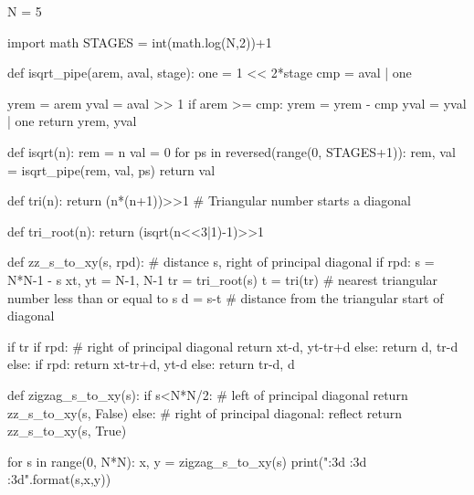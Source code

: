 \documentclass[10pt]{article}
\theoremstyle{theorem}
\begin{document}
\begin{python}
N = 5

import math
STAGES = int(math.log(N,2))+1

def isqrt_pipe(arem, aval, stage):
    one = 1 << 2*stage
    cmp = aval | one

    yrem = arem
    yval = aval >> 1
    if arem >= cmp:
        yrem = yrem - cmp
        yval = yval | one
    return yrem, yval

def isqrt(n):
    rem = n
    val = 0
    for ps in reversed(range(0, STAGES+1)):
        rem, val = isqrt_pipe(rem, val, ps)
    return val

def tri(n):
    return (n*(n+1))>>1 # Triangular number starts a diagonal

def tri_root(n):
    return (isqrt(n<<3|1)-1)>>1

def zz_s_to_xy(s, rpd): # distance s, right of principal diagonal
    if rpd:
        s = N*N-1 - s
        xt, yt = N-1, N-1
    tr = tri_root(s)
    t = tri(tr) # nearest triangular number less than or equal to s
    d = s-t     # distance from the triangular start of diagonal

    if tr%
        if rpd: # right of principal diagonal
            return xt-d, yt-tr+d
        else:
            return d, tr-d
    else:
        if rpd:
            return xt-tr+d, yt-d
        else:
            return tr-d, d

def zigzag_s_to_xy(s):
    if s<N*N/2: # left of principal diagonal
        return zz_s_to_xy(s, False)
    else:         # right of principal diagonal: reflect
        return zz_s_to_xy(s, True)

for s in range(0, N*N):
    x, y = zigzag_s_to_xy(s)
    print("{:3d} {:3d} {:3d}".format(s,x,y))
\end{python}


\printbibliography
\end{document}
